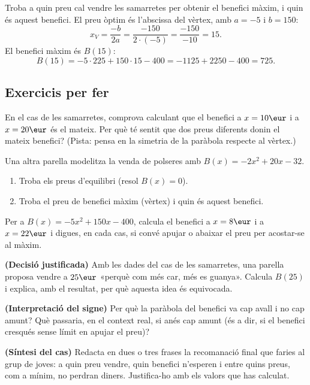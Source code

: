 \begin{exresolt}
Troba a quin preu cal vendre les samarretes per obtenir el benefici màxim, i quin és
aquest benefici.
\solucio
El preu òptim és l'abscissa del vèrtex, amb $a=-5$ i $b=150$:
\[
x_V=\frac{-b}{2a}=\frac{-150}{2\cdot(-5)}=\frac{-150}{-10}=15.
\]
El benefici màxim és $B(15)$:
\[
B(15)=-5\cdot 225+150\cdot 15-400=-1125+2250-400=725.
\]
\end{exresolt}

\subsection{Exercicis per fer}

\begin{exercicis}
\begin{exlist}
  \item En el cas de les samarretes, comprova calculant que el benefici a $x=10\eur$
        i a $x=20\eur$ és el mateix. Per què té sentit que dos preus diferents donin el
        mateix benefici? (Pista: pensa en la simetria de la paràbola respecte al vèrtex.)
  \item Una altra parella modelitza la venda de polseres amb $B(x)=-2x^2+20x-32$.
        \begin{enumerate}[label=\alph*), leftmargin=1.6em, topsep=2pt]
          \item Troba els preus d'equilibri (resol $B(x)=0$).
          \item Troba el preu de benefici màxim (vèrtex) i quin és aquest benefici.
        \end{enumerate}
  \item Per a $B(x)=-5x^2+150x-400$, calcula el benefici a $x=8\eur$ i a $x=22\eur$ i
        digues, en cada cas, si convé apujar o abaixar el preu per acostar-se al màxim.
  \item \textbf{(Decisió justificada)} Amb les dades del cas de les samarretes, una
        parella proposa vendre a $25\eur$ «perquè com més car, més es guanya». Calcula
        $B(25)$ i explica, amb el resultat, per què aquesta idea és equivocada.
  \item \textbf{(Interpretació del signe)} Per què la paràbola del benefici va cap
        avall i no cap amunt? Què passaria, en el context real, si anés cap amunt (és a
        dir, si el benefici cresqués sense límit en apujar el preu)?
  \item \textbf{(Síntesi del cas)} Redacta en dues o tres frases la recomanació final
        que faries al grup de joves: a quin preu vendre, quin benefici n'esperen i
        entre quins preus, com a mínim, no perdran diners. Justifica-ho amb els valors
        que has calculat.
\end{exlist}
\end{exercicis}

